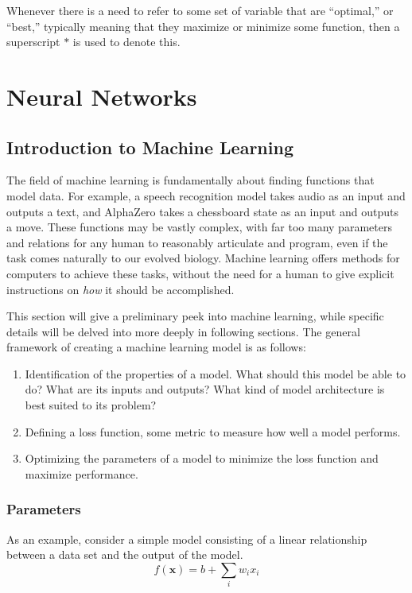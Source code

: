 \documentclass[12pt]{report}
\theoremstyle{definition}
\theoremstyle{remark}
\begin{document}
Whenever there is a need to refer to some set of variable that are ``optimal,'' or ``best,'' typically meaning that they maximize or minimize some function, then a superscript $\ast$ is used to denote this.


\chapter{Neural Networks}
\section{Introduction to Machine Learning}
The field of machine learning is fundamentally about finding functions that model data. For example, a speech recognition model takes audio as an input and outputs a text, and AlphaZero takes a chessboard state as an input and outputs a move. These functions may be vastly complex, with far too many parameters and relations for any human to reasonably articulate and program, even if the task comes naturally to our evolved biology. Machine learning offers methods for computers to achieve these tasks, without the need for a human to give explicit instructions on \textit{how} it should be accomplished.

This section will give a preliminary peek into machine learning, while specific details will be delved into more deeply in following sections. The general framework of creating a machine learning model is as follows:

\begin{enumerate}
    \item Identification of the properties of a model. What should this model be able to do? What are its inputs and outputs? What kind of model architecture is best suited to its problem?
    \item Defining a loss function, some metric to measure how well a model performs.
    \item Optimizing the parameters of a model to minimize the loss function and maximize performance.
\end{enumerate}

\subsection{Parameters}

As an example, consider a simple model consisting of a linear relationship between a data set and the output of the model.
\begin{equation}
    f(\mathbf{x}) = b +\sum_i w_i x_i
\end{equation}
\end{document}
